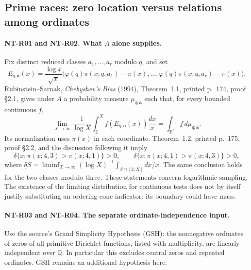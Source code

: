 \documentclass[11pt,a4paper]{article}
\begin{document}
\subsection{Prime races: zero location versus relations among ordinates}

\paragraph{NT-R01 and NT-R02. What $A$ alone supplies.}
Fix distinct reduced classes $a_1,\ldots,a_r$ modulo $q$, and set
\[
 E_{q;\boldsymbol a}(x)=\frac{\log x}{\sqrt x}
 \bigl(\varphi(q)\pi(x;q,a_1)-\pi(x),\ldots,
       \varphi(q)\pi(x;q,a_r)-\pi(x)\bigr).
\]
Rubinstein--Sarnak, \emph{Chebyshev's Bias} (1994), Theorem~1.1,
printed p.~174, proof \S2.1, gives under $A$ a probability measure
$\mu_{q;\boldsymbol a}$ such that, for every bounded continuous $f$,
\[
 \lim_{X\to\infty}\frac1{\log X}
       \int_2^X f(E_{q;\boldsymbol a}(x))\frac{dx}{x}
   =\int_{\mathbb R^r}f\,d\mu_{q;\boldsymbol a}.
\tag{NT-R01}
\]
Its normalization uses $\pi(x)$ in each coordinate.  Theorem~1.2,
printed p.~175, proof \S2.2, and the discussion following it imply
\[
 \underline\delta\{x:\pi(x;4,3)>\pi(x;4,1)\}>0,
 \qquad
 \underline\delta\{x:\pi(x;4,1)>\pi(x;4,3)\}>0,
\tag{NT-R02}
\]
where $\underline\delta S=\liminf_{X\to\infty}
(\log X)^{-1}\int_{S\cap[2,X]}dx/x$.
The same conclusion holds for the two classes modulo three.
These statements concern logarithmic sampling.  The existence of the
limiting distribution for continuous tests does not by itself justify
substituting an ordering-cone indicator: its boundary could have mass.

\paragraph{NT-R03 and NT-R04. The separate ordinate-independence input.}
Use the source's Grand Simplicity Hypothesis (GSH): the nonnegative
ordinates of zeros of all primitive Dirichlet functions, listed with
multiplicity, are linearly independent over $\mathbb Q$.  In particular
this excludes central zeros and repeated ordinates.  GSH remains an
additional hypothesis here.
\end{document}
